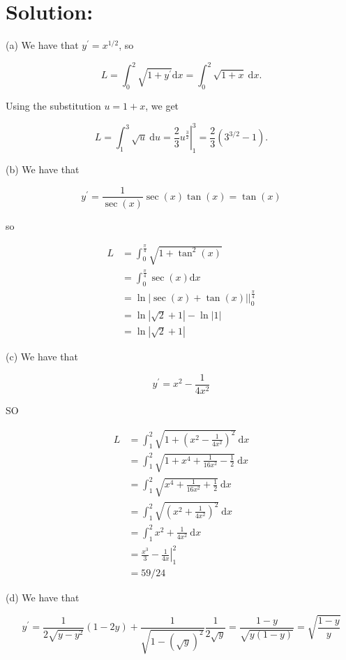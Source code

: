 \documentclass[10pt]{article}
\begin{document}
\section*{Solution:}
(a) We have that $y^{\prime}=x^{1 / 2}$, so

$$
L=\int_{0}^{2} \sqrt{1+y^{\prime}} \mathrm{d} x=\int_{0}^{2} \sqrt{1+x} \mathrm{~d} x .
$$

Using the substitution $u=1+x$, we get

$$
L=\int_{1}^{3} \sqrt{u} \mathrm{~d} u=\left.\frac{2}{3} u^{\frac{3}{2}}\right|_{1} ^{3}=\frac{2}{3}\left(3^{3 / 2}-1\right) .
$$

(b) We have that

$$
y^{\prime}=\frac{1}{\sec (x)} \sec (x) \tan (x)=\tan (x)
$$

so

$$
\begin{aligned}
L & =\int_{0}^{\frac{\pi}{4}} \sqrt{1+\tan ^{2}(x)} \\
& =\int_{0}^{\frac{\pi}{4}} \sec (x) \mathrm{d} x \\
& =\left.\ln |\sec (x)+\tan (x)|\right|_{0} ^{\frac{\pi}{4}} \\
& =\ln |\sqrt{2}+1|-\ln |1| \\
& =\ln |\sqrt{2}+1|
\end{aligned}
$$

(c) We have that

$$
y^{\prime}=x^{2}-\frac{1}{4 x^{2}}
$$

SO

$$
\begin{aligned}
L & =\int_{1}^{2} \sqrt{1+\left(x^{2}-\frac{1}{4 x^{2}}\right)^{2}} \mathrm{~d} x \\
& =\int_{1}^{2} \sqrt{1+x^{4}+\frac{1}{16 x^{2}}-\frac{1}{2}} \mathrm{~d} x \\
& =\int_{1}^{2} \sqrt{x^{4}+\frac{1}{16 x^{2}}+\frac{1}{2}} \mathrm{~d} x \\
& =\int_{1}^{2} \sqrt{\left(x^{2}+\frac{1}{4 x^{2}}\right)^{2}} \mathrm{~d} x \\
& =\int_{1}^{2} x^{2}+\frac{1}{4 x^{2}} \mathrm{~d} x \\
& =\frac{x^{3}}{3}-\left.\frac{1}{4 x}\right|_{1} ^{2} \\
& =59 / 24
\end{aligned}
$$

(d) We have that

$$
y^{\prime}=\frac{1}{2 \sqrt{y-y^{2}}}(1-2 y)+\frac{1}{\sqrt{1-(\sqrt{y})^{2}}} \frac{1}{2 \sqrt{y}}=\frac{1-y}{\sqrt{y(1-y)}}=\sqrt{\frac{1-y}{y}}
$$
\end{document}
